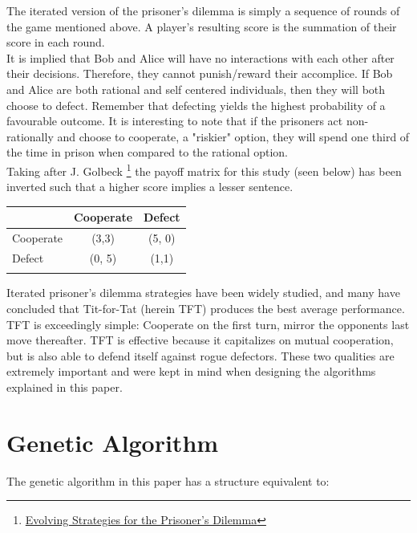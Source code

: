 \documentclass[12pt]{article}
\begin{document}
The iterated version of the prisoner's dilemma is simply a sequence of rounds of
the game mentioned above.  A player's resulting score is the summation of their score in
each round. \\

It is implied that Bob and Alice will have no interactions with each other after
their decisions. Therefore, they cannot punish/reward their accomplice. If Bob and Alice are
both rational and self centered individuals, then they will both choose to defect. Remember that defecting
yields the highest probability of a favourable outcome.  It is interesting to note
that if the prisoners act non-rationally and choose to cooperate, a "riskier" option, they will spend one third of the time in prison when compared
to the rational option. \\

Taking after J. Golbeck
\footnote{\href{http://cgis.cs.umd.edu/~golbeck/downloads/JGolbeck\_prison.pdf}
{Evolving Strategies for the Prisoner's Dilemma}}
the payoff matrix for this study (seen below) has been
inverted such that a higher score implies a lesser sentence. \\

\begin{center}
    \begin{tabular}{l | c | c}
         & Cooperate & Defect \\
        \hline
        Cooperate & (3,3) & (5, 0)\\
        \hline
        Defect & (0, 5) & (1,1) \\ \\
    \end{tabular}
\end{center}

Iterated prisoner's dilemma strategies have been widely studied, and many have
concluded that Tit-for-Tat (herein TFT) produces the best average performance.
TFT is exceedingly simple: Cooperate on the first turn, mirror the opponents
last move thereafter.  TFT is effective because it capitalizes on mutual
cooperation, but is also able to defend itself against rogue defectors.  These
two qualities are extremely important and were kept in mind when designing the
algorithms explained in this paper.
\section{Genetic Algorithm}

The genetic algorithm in this paper has a structure equivalent to: \\
\end{document}

